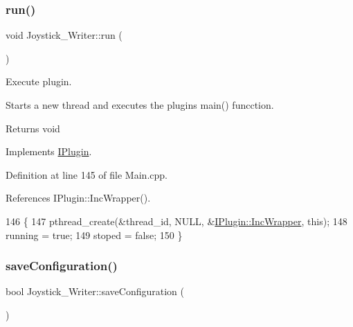 \mbox{\label{class_joystick___writer_aa1ab2778180c281887758883622b78bf}} 
\subsubsection{\texorpdfstring{run()}{run()}}
{\footnotesize\ttfamily void Joystick\+\_\+\+Writer\+::run (\begin{DoxyParamCaption}{ }\end{DoxyParamCaption})\hspace{0.3cm}{\ttfamily [virtual]}}



Execute plugin. 

Starts a new thread and executes the plugins main() funcction. \begin{DoxyReturn}{Returns}
void 
\end{DoxyReturn}


Implements \hyperlink{class_i_plugin_a46b4ace767e77f9db9c9585e99c09039}{I\+Plugin}.



Definition at line 145 of file Main.\+cpp.



References I\+Plugin\+::\+Inc\+Wrapper().


\begin{DoxyCode}
146 \{
147     pthread\_create(&thread\_id, NULL, &\hyperlink{class_i_plugin_a62d22be2fdf66eb7f5c2f797f5f3d7f3}{IPlugin::IncWrapper}, \textcolor{keyword}{this});
148     running = \textcolor{keyword}{true};
149     stoped = \textcolor{keyword}{false};
150 \}
\end{DoxyCode}
\mbox{\label{class_joystick___writer_a67a56e0ae63ad59657f4745dcac2f7a3}} 
\subsubsection{\texorpdfstring{save\+Configuration()}{saveConfiguration()}}
{\footnotesize\ttfamily bool Joystick\+\_\+\+Writer\+::save\+Configuration (\begin{DoxyParamCaption}{ }\end{DoxyParamCaption})\hspace{0.3cm}{\ttfamily [virtual]}}



